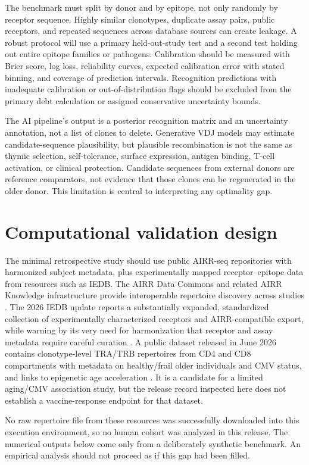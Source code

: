 \documentclass[11pt]{article}
\begin{document}
The benchmark must split by donor and by epitope, not only randomly by receptor sequence. Highly similar clonotypes, duplicate assay pairs, public receptors, and repeated sequences across database sources can create leakage. A robust protocol will use a primary held-out-study test and a second test holding out entire epitope families or pathogens. Calibration should be measured with Brier score, log loss, reliability curves, expected calibration error with stated binning, and coverage of prediction intervals. Recognition predictions with inadequate calibration or out-of-distribution flags should be excluded from the primary debt calculation or assigned conservative uncertainty bounds.

The AI pipeline's output is a posterior recognition matrix and an uncertainty annotation, not a list of clones to delete. Generative VDJ models may estimate candidate-sequence plausibility, but plausible recombination is not the same as thymic selection, self-tolerance, surface expression, antigen binding, T-cell activation, or clinical protection. Candidate sequences from external donors are reference comparators, not evidence that those clones can be regenerated in the older donor. This limitation is central to interpreting any optimality gap.

\section{Computational validation design}
The minimal retrospective study should use public AIRR-seq repositories with harmonized subject metadata, plus experimentally mapped receptor--epitope data from resources such as IEDB. The AIRR Data Commons and related AIRR Knowledge infrastructure provide interoperable repertoire discovery across studies \citep{AIRR2023}. The 2026 IEDB update reports a substantially expanded, standardized collection of experimentally characterized receptors and AIRR-compatible export, while warning by its very need for harmonization that receptor and assay metadata require careful curation \citep{IEDB2026}. A public dataset released in June 2026 contains clonotype-level TRA/TRB repertoires from CD4 and CD8 compartments with metadata on healthy/frail older individuals and CMV status, and links to epigenetic age acceleration \citep{Breens2026data}. It is a candidate for a limited aging/CMV association study, but the release record inspected here does not establish a vaccine-response endpoint for that dataset.

No raw repertoire file from these resources was successfully downloaded into this execution environment, so no human cohort was analyzed in this release. The numerical outputs below come only from a deliberately synthetic benchmark. An empirical analysis should not proceed as if this gap had been filled.
\end{document}
